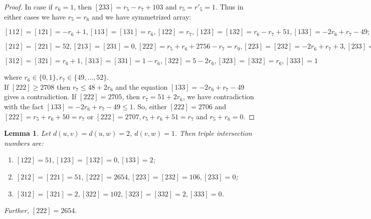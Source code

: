 \documentclass{article}
\newtheorem{lemma}{Lemma}
\theoremstyle{definition}
\theoremstyle{definition}
\theoremstyle{remark}
\begin{document}
\begin{proof}
In case if $r_6 = 1$, then $[233] = r_5 - r_7 + 103$ and  $r_5 = r'_5 = 1$. Thus in either cases we have $r_5 = r_6$ and we have symmetrized array:

 $[112] = [121] = -r_6 + 1, [113] = [131] = r_6 , [122] = r_7 , [123] = [132] = r_6 - r_7 + 51, [133] = -2r_6 + r_7 - 49;$

$[212] = [221] = 52, [213] = [231] = 0, [222] = r_5 + r_6 + 2756 - r_7 = r_9 , [223] = [232] = -2r_6 + r_7 + 3, [233] = 2r_6 - r_7 + 102;$

$[312] = [321] = r_6 + 1, [313] = [331] = 1 - r_6, [322] = 5 - 2r_6 , [323] = [332] = r_6 , [333] = 1$

where $r_6 \in \{0, 1\}, r_7 \in \{49, ..., 52\}$. \\

If $[222] \ge 2708$ then $r_7 \le 48 + 2r_6$ and the equation $[133] = -2r_6 + r_7 - 49$ gives a contradiction.
If $[222] = 2705$, then $r_7 = 51 + 2r_6$, we have contradiction with the fact $[133] = -2r_6 + r_7 - 49 \le 1$. So, either
$[222] = 2706$ and $[222] = r_5 + r_6 + 50 = r_7$ or $[222] = 2707, r_5 + r_6 + 51 = r_7$ and $r_5 + r_6 = 0$.

\end{proof}

\begin{lemma} Let $d(u, v) = d(u, w) = 2$, $d(v, w) = 1$. Then triple intersection numbers are:
    \begin{enumerate}
	\item $[122] = 51, [123] = [132] = 0, [133] = 2$;
	\item $[212] = [221] = 51, [222] = 2654, [223] = [232] = 106, [233] = 0$;
	\item $[312] = [321] = 2, [322] = 102, [323] = [332] = 2, [333] = 0$.
    \end{enumerate}
Further, $[222] = 2654$.
\label{lem:4}
\end{lemma}
\end{document}
